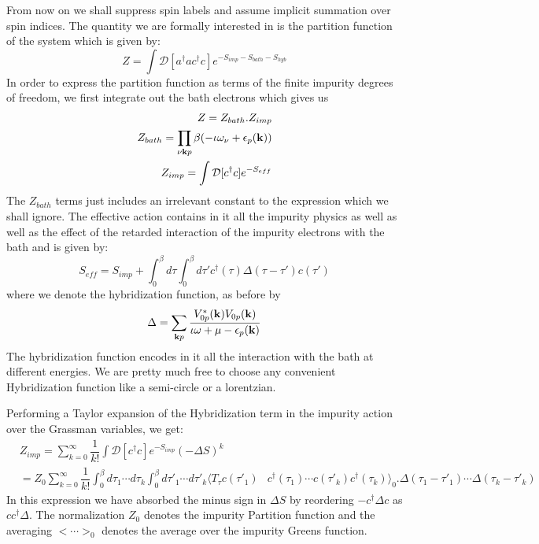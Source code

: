\documentclass[10pt]{ruthesis}
\begin{document}
 From now on we shall suppress spin labels and assume implicit summation over spin indices. The quantity we are formally interested in is the partition function of the system which is given by:
 \begin{equation}
 Z=\int \mathcal{D}[a^{\dagger}ac^{\dagger}c] e^{-S_{imp}-S_{bath}-S_{hyb}}
\end{equation}
In order to express the partition function as terms of the finite impurity degrees of freedom, we first integrate out the bath electrons which gives us
\begin{eqnarray}
Z=Z_{bath}.Z_{imp}\\
Z_{bath}=\prod_{\nu \mathbf{k} p} \beta(-\iota\omega_{\nu} +\epsilon_{p}(\mathbf{k}))\\
Z_{imp}=\int\mathcal{D}[c^{\dagger}c] e^{-S_{eff}}
\end{eqnarray}
The $Z_{bath}$ terms just includes an irrelevant constant to the expression which we shall ignore. The effective action contains in it all the impurity physics as well as well as the effect of the retarded interaction of the impurity electrons with the bath and is given by:
\begin{equation}
S_{eff}=S_{imp}+\int_{0}^{\beta}d\tau\int_{0}^{\beta}d\tau' c^{\dagger}(\tau)\Delta(\tau-\tau')c(\tau')
\end{equation}
 where we denote the hybridization function, as before by
 \begin{equation}
 \Delta= \sum_{\mathbf{k} p}\dfrac{V_{0p}^{*}(\mathbf{k})V_{0p}(\mathbf{k})}{\iota\omega+\mu-\epsilon_{p}(\mathbf{k})}
 \end{equation}
The hybridization function encodes in it all the interaction with the bath at different energies. We are pretty much free to choose any convenient Hybridization function like a semi-circle or a lorentzian.


Performing a Taylor expansion of the Hybridization term in the impurity action over the Grassman variables, we get:
\begin{align}
&Z_{imp}=\sum_{k=0}^{\infty}\dfrac{1}{k!}\int \mathcal{D}[c^{\dagger}c]e^{-S_{imp}}(-\Delta S)^{k}\\
 &=Z_{0}\sum_{k=0}^{\infty}\dfrac{1}{k!}\int_{0}^{\beta}d\tau_{1}\cdots d\tau_{k}\int_{0}^{\beta}d\tau'_{1}\cdots d\tau'_{k}\langle T_{\tau} c(\tau'_{1}) & c^{\dagger}(\tau_{1})\cdots c(\tau'_{k})c^{\dagger}(\tau_{k})\rangle_{0}. \Delta(\tau_{1}-\tau'_{1})\cdots\Delta(\tau_{k}-\tau'_{k})
 \end{align} 
In this expression we have absorbed the minus sign in $\Delta S$ by reordering $-c^{\dagger}\Delta c$ as  $c c^{\dagger} \Delta$. The normalization $Z_{0}$ denotes the impurity Partition function and the averaging $<\cdots>_{0}$ denotes the average over the impurity Greens function.
\end{document}

